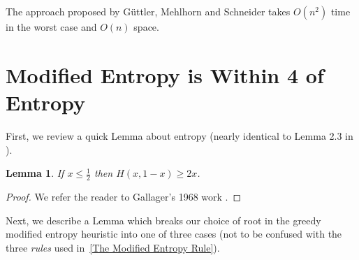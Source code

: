 \documentclass[letterpaper,12pt,titlepage,oneside,final]{book}
\theoremstyle{plain}
\newtheorem{lem}[thm]{Lemma}
\begin{document}
The approach proposed by G{\"u}ttler, Mehlhorn and Schneider takes $O(n^2)$ time in the worst case and $O(n)$ space.

\section{Modified Entropy is Within 4 of Entropy}

First, we review a quick Lemma about entropy (nearly identical to Lemma 2.3 in \cite{bayer1975improved}).

\begin{lem}\label{entr2x}
If $x \leq \frac{1}{2}$ then $H(x, 1-x) \geq 2x$.
\end{lem}
\begin{proof}
We refer the reader to Gallager's 1968 work \cite{gallager1968information}.
\end{proof}

Next, we describe a Lemma which breaks our choice of root in the greedy modified entropy heuristic into one of three cases (not to be confused with the three \textit{rules} used in~\ref{The Modified Entropy Rule}). 
\end{document}
